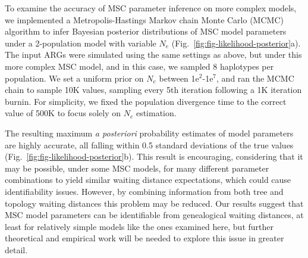 \documentclass[11pt]{article}
\begin{document}
To examine the accuracy of MSC parameter inference on more complex 
models, we implemented a Metropolis-Hastings Markov chain Monte Carlo 
(MCMC) algorithm to infer Bayesian posterior distributions of MSC model 
parameters under a 2-population model with variable $N_e$ 
(Fig.~\ref{fig:fig-likelihood-posterior}a).
The input ARGs were simulated using the same settings as above, 
but under this more complex MSC model, and in this case, 
we sampled 8 haplotypes per population. We set a uniform prior on 
$N_e$ between 1e$^2$-1e$^7$, and ran the MCMC chain to sample 
10K values, sampling every 5th iteration following a 1K iteration 
burnin. For simplicity, we fixed the population divergence time to 
the correct value of 500K to focus solely on $N_e$ estimation. 

The resulting maximum \emph{a posteriori} probability estimates of 
model parameters are highly accurate, all falling within 0.5 
standard deviations of the true values 
(Fig.~\ref{fig:fig-likelihood-posterior}b). 
This result is encouraging, considering that it may be possible, under
some MSC models, for many different parameter combinations to yield 
similar waiting distance expectations, which could cause identifiability
issues. However, by combining information from both tree and topology 
waiting distances this problem may be reduced. Our results suggest 
that MSC model parameters can be identifiable from genealogical 
waiting distances, at least for relatively simple models like the ones
examined here, but further theoretical and empirical work will be needed
to explore this issue in greater detail.




\end{document}
